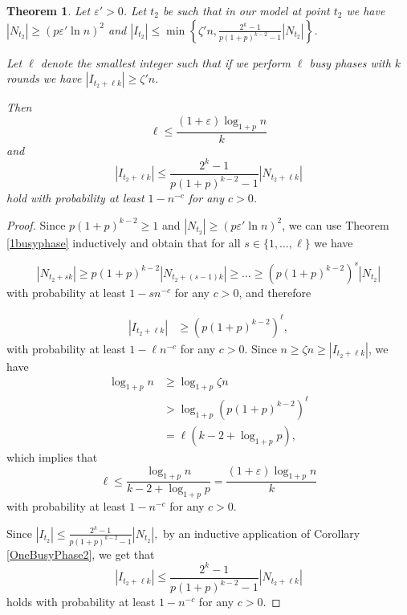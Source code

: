 \documentclass[12pt]{article}
\newtheorem{theorem}{Theorem}
\newcommand{\e}{\varepsilon}
\begin{document}
{\begin{theorem}\label{allbusyphases}
Let $\e' > 0$. Let $t_2$ be such that in our model at point $t_2$ we have $|N_{t_2}|\geq (p\e'\ln n)^2$ and $|I_{t_2}|\leq \min\left\{\zeta' n , \frac{2^k-1}{p(1+p)^{k-2}-1}|N_{t_2}|\right\}$. 

Let $\ell$ denote the smallest integer such that if we perform $\ell$ busy phases with $k$ rounds we have $|I_{t_2+\ell k}| \geq \zeta' n.$

Then $$\ell \leq \frac{(1+\e)\log_{1+p}n}{k}$$
and
\begin{equation*}
|I_{t_2 + \ell k}| \leq \frac{2^k-1}{p(1+p)^{k-2}-1}|N_{t_2 + \ell k}|
\end{equation*}
hold with probability at least $1 - n^{-c}$ for any $c >0$.
\end{theorem}

\begin{proof} 
Since $p(1+p)^{k-2} \geq 1$ and $|N_{t_2}| \geq (p\e'\ln n)^2$, we can use Theorem \ref{1busyphase} inductively and obtain that for all $ s\in\{1,\dots,\ell\}$ we have

\begin{equation*}
|N_{t_2+sk}|\geq p(1+p)^{k-2}|N_{t_2+(s-1)k}|\geq\dots\geq  \left(p(1+p)^{k-2}\right)^s	|N_{t_2}|
\end{equation*}
with probability at least $1 - sn^{-c}$ for any $c >0$, and therefore

\begin{align*}
|I_{t_2+\ell k}|&\geq \left(p(1+p)^{k-2}\right)^{\ell},
\end{align*}
with probability at least $1 - \ell n^{-c}$ for any $c >0$.
Since $ n \geq \zeta n \geq |I_{t_2 + \ell k}|$, we have
\begin{align*}
\log_{1+p}n
&\geq 	\log_{1+p}\zeta n\\
&> \log_{1+p}\left(p(1+p)^{k-2}\right)^{\ell}\\
&=\ell(k-2+\log_{1+p}p),
\end{align*}
which implies that
$$
{\ell}\leq \frac{\log_{1+p}n}{k-2+\log_{1+p}p} = \frac{(1+\e)\log_{1+p}n}{k}$$
with probability at least $1 - n^{-c}$ for any $c >0$.

Since
$
|I_{t_2}| \leq \frac{2^k-1}{p(1+p)^{k-2}-1}|N_{t_2}|,
$
by an inductive application of Corollary \ref{OneBusyPhase2}, we get that 
\begin{equation*}
|I_{t_2 + \ell k}| \leq \frac{2^k-1}{p(1+p)^{k-2}-1}|N_{t_2 + \ell k}|
\end{equation*}
holds with probability at least $1 - n^{-c}$ for any $c >0$.
\end{proof}



}
\end{document}
